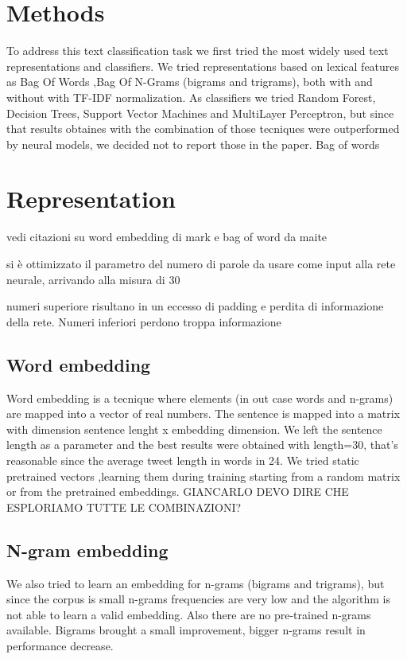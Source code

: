\section{Methods} \label{sec:methods}
To address this text classification task we first tried the most widely used text representations and classifiers.
We tried representations based on lexical features as Bag Of Words \cite{harris1954distributional},Bag Of N-Grams (bigrams and trigrams), both with and without with TF-IDF normalization.
As classifiers we tried Random Forest, Decision Trees, Support Vector Machines and MultiLayer Perceptron, but since that results obtaines with the combination of those tecniques were outperformed by neural models, we decided not to report those in the paper.
Bag of words
\section{Representation}

vedi citazioni su word embedding di mark e bag of word da maite



si è ottimizzato il parametro del numero di parole da usare come input alla rete neurale, arrivando alla misura di 30

numeri superiore risultano in un eccesso di padding e perdita di informazione della rete. Numeri inferiori perdono troppa informazione

\subsection{Word embedding}

Word embedding is a tecnique where elements (in out case words and n-grams) are mapped into a vector of real numbers.
The sentence is mapped into a matrix with dimension sentence lenght x embedding dimension.
We left the sentence length as a parameter and the best results were obtained with length=30, that's reasonable since the average tweet length in words in 24.
We tried static pretrained vectors \cite{bojanowski2016enriching},learning them during training starting from a random matrix or from the pretrained embeddings.
GIANCARLO DEVO DIRE CHE ESPLORIAMO TUTTE LE COMBINAZIONI?

\subsection{N-gram embedding}
We also tried to learn an embedding for n-grams (bigrams and trigrams), but since the corpus is small n-grams frequencies are very low and the algorithm is not able to learn a valid embedding.
Also there are no pre-trained n-grams available.
Bigrams brought a small improvement, bigger n-grams result in performance decrease.



